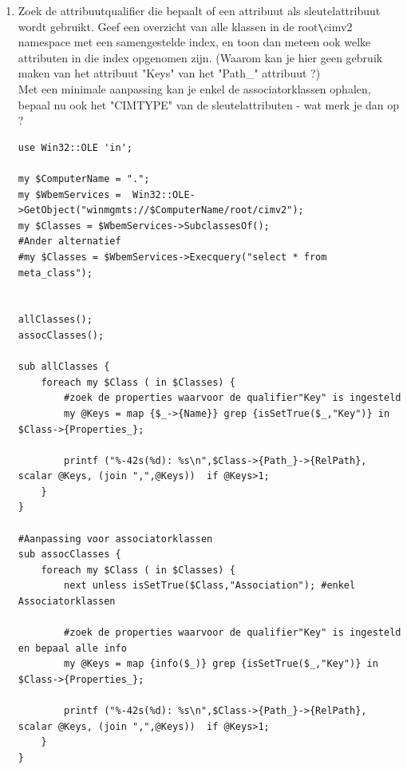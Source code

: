 \documentclass[11pt,a4paper]{report}
\begin{document}
\begin{enumerate}[resume]
\begin{lstlisting}
print "De Property Qualifiers van alle attributen van de klasse ",$ClassName,"\n\n";
foreach my $prop (in $Class->{Properties_}){ #enkel de properties die specifiek zijn voor de klasse
	my $Qualifiers = $prop->{Qualifiers_};
	printf "\n\n%s",$prop->{Name};
	if ($Qualifiers->Item("CIMTYPE")){
		printf " (%s <->%s = %s)",$prop->{CIMType},
		$Qualifiers->Item("CIMTYPE")->{Value},$cimtype{$prop->{CIMType}};     #de attribuutqualifiers bevat een duidelijke naam voor het type
	}
	printf "\n   Qualifiers: %s", join(" ",map {$_->{Name}} in $Qualifiers);
}
	\end{lstlisting}
	\item Zoek de attribuutqualifier die bepaalt of een attribuut als sleutelattribuut wordt gebruikt. Geef een overzicht van alle klassen in de root\verb+\+cimv2 namespace met een samengestelde index, en toon dan meteen ook welke attributen in die index opgenomen zijn.
	(Waarom kan je hier geen gebruik maken van het attribuut "Keys" van het "Path\_" attribuut ?)
	\\Met een minimale aanpassing kan je enkel de associatorklassen ophalen, bepaal nu ook het "CIMTYPE" van de sleutelattributen - wat merk je dan op ?
	\begin{lstlisting}
use Win32::OLE 'in';

my $ComputerName = ".";
my $WbemServices =  Win32::OLE->GetObject("winmgmts://$ComputerName/root/cimv2");
my $Classes = $WbemServices->SubclassesOf();
#Ander alternatief
#my $Classes = $WbemServices->Execquery("select * from meta_class");


allClasses();
assocClasses();

sub allClasses {
	foreach my $Class ( in $Classes) {
		#zoek de properties waarvoor de qualifier"Key" is ingesteld
		my @Keys = map {$_->{Name}} grep {isSetTrue($_,"Key")} in $Class->{Properties_};
		
		printf ("%-42s(%d): %s\n",$Class->{Path_}->{RelPath}, scalar @Keys, (join ",",@Keys))  if @Keys>1;
	}
}

#Aanpassing voor associatorklassen
sub assocClasses {
	foreach my $Class ( in $Classes) {
		next unless isSetTrue($Class,"Association"); #enkel Associatorklassen
		
		#zoek de properties waarvoor de qualifier"Key" is ingesteld en bepaal alle info
		my @Keys = map {info($_)} grep {isSetTrue($_,"Key")} in $Class->{Properties_};
		
		printf ("%-42s(%d): %s\n",$Class->{Path_}->{RelPath}, scalar @Keys, (join ",",@Keys))  if @Keys>1;
	}
}


\end{lstlisting}
\end{enumerate}
\end{document}
